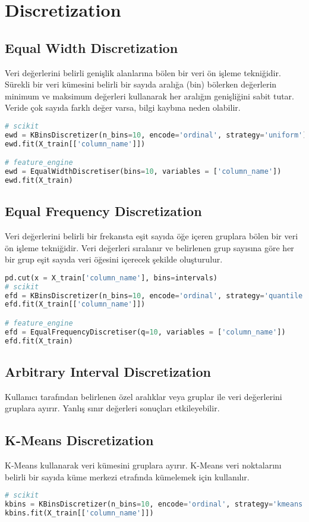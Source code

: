 \section{Discretization}

\subsection{Equal Width Discretization}
Veri değerlerini belirli genişlik alanlarına bölen bir veri ön işleme tekniğidir. Sürekli bir veri kümesini belirli bir sayıda aralığa (bin) bölerken değerlerin minimum ve maksimum değerleri kullanarak her aralığın genişliğini sabit tutar. Veride çok sayıda farklı değer varsa, bilgi kaybına neden olabilir.

\begin{lstlisting}[language=Python, caption=Scikit-learn ve feature\_engine örneği.]
# scikit
ewd = KBinsDiscretizer(n_bins=10, encode='ordinal', strategy='uniform')
ewd.fit(X_train[['column_name']])

# feature_engine
ewd = EqualWidthDiscretiser(bins=10, variables = ['column_name'])
ewd.fit(X_train)
\end{lstlisting}

\subsection{Equal Frequency Discretization}
Veri değerlerini belirli bir frekansta eşit sayıda öğe içeren gruplara bölen bir veri ön işleme tekniğidir. Veri değerleri sıralanır ve belirlenen grup sayısına göre her bir grup eşit sayıda veri öğesini içerecek şekilde oluşturulur.

\begin{lstlisting}[language=Python, caption=Scikit-learn ve feature\_engine örneği.]
pd.cut(x = X_train['column_name'], bins=intervals)
# scikit
efd = KBinsDiscretizer(n_bins=10, encode='ordinal', strategy='quantile')
efd.fit(X_train[['column_name']])

# feature_engine
efd = EqualFrequencyDiscretiser(q=10, variables = ['column_name'])
efd.fit(X_train)
\end{lstlisting}

\subsection{Arbitrary Interval Discretization}
Kullanıcı tarafından belirlenen özel aralıklar veya gruplar ile veri değerlerini gruplara ayırır. Yanlış sınır değerleri sonuçları etkileyebilir.

\subsection{K-Means Discretization}
K-Means kullanarak veri kümesini gruplara ayırır. K-Means veri noktalarını belirli bir sayıda küme merkezi etrafında kümelemek için kullanılır.

\begin{lstlisting}[language=Python, caption=Scikit-learn örneği.]
# scikit
kbins = KBinsDiscretizer(n_bins=10, encode='ordinal', strategy='kmeans')
kbins.fit(X_train[['column_name']])
\end{lstlisting}

\newpage